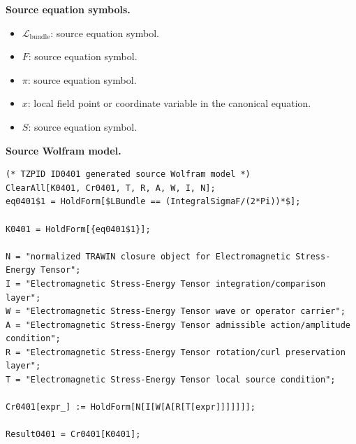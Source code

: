 \begin{minipage}[t]{0.49\linewidth}
\begingroup
\small
\raggedright
\textbf{Source equation symbols.}\par
\begin{itemize}[leftmargin=1.35em,itemsep=1pt,topsep=1pt,parsep=0pt]
    \item $\mathcal{L}_{\mathrm{bundle}}$: source equation symbol.
    \item $F$: source equation symbol.
    \item $\pi$: source equation symbol.
    \item $x$: local field point or coordinate variable in the canonical equation.
    \item $S$: source equation symbol.
\end{itemize}
\endgroup
\end{minipage}\hfill
\begin{minipage}[t]{0.47\linewidth}
\begingroup
\scriptsize
\raggedright
\textbf{Source Wolfram model.}\par
\begin{Verbatim}[fontsize=\tiny,breaklines=true,breakanywhere=true]
(* TZPID ID0401 generated source Wolfram model *)
ClearAll[K0401, Cr0401, T, R, A, W, I, N];
eq0401$1 = HoldForm[$LBundle == (IntegralSigmaF/(2*Pi))*$];

K0401 = HoldForm[{eq0401$1}];

N = "normalized TRAWIN closure object for Electromagnetic Stress-Energy Tensor";
I = "Electromagnetic Stress-Energy Tensor integration/comparison layer";
W = "Electromagnetic Stress-Energy Tensor wave or operator carrier";
A = "Electromagnetic Stress-Energy Tensor admissible action/amplitude condition";
R = "Electromagnetic Stress-Energy Tensor rotation/curl preservation layer";
T = "Electromagnetic Stress-Energy Tensor local source condition";

Cr0401[expr_] := HoldForm[N[I[W[A[R[T[expr]]]]]]];

Result0401 = Cr0401[K0401];
\end{Verbatim}
\endgroup
\end{minipage}

